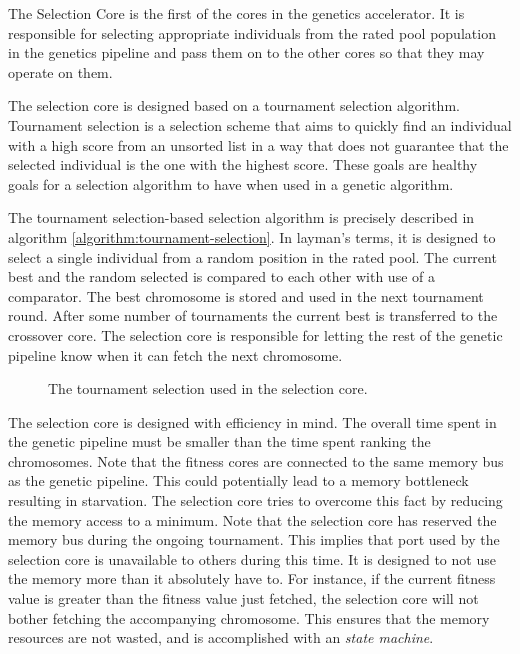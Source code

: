 The Selection Core is the first of the cores in the genetics accelerator.
It is responsible for selecting appropriate individuals from the rated pool population in the genetics pipeline and pass them on to the other cores so that they may operate on them.

The selection core is designed based on a tournament selection algorithm.
Tournament selection is a selection scheme that aims to quickly find an individual with a high score from an unsorted list in a way that does not guarantee that the selected individual is the one with the highest score.
These goals are healthy goals for a selection algorithm to have when used in a genetic algorithm.

The tournament selection-based selection algorithm is precisely described in algorithm \vref{algorithm:tournament-selection}.
In layman's terms, it is designed to select a single individual from a random position in the rated pool.
The current best and the random selected is compared to each other with use of a comparator.
The best chromosome is stored and used in the next tournament round.
After some number of tournaments the current best is transferred to the crossover core.
The selection core is responsible for letting the rest of the genetic pipeline know when it can fetch the next chromosome. 

\begin{figure}[H]
\begin{algorithm}[H]
\SetAlgoLined
\DontPrintSemicolon
{}
\caption{The tournament selection used in the selection core.}
\label{algorithm:tournament-selection}
\end{algorithm}
\end{figure}

The selection core is designed with efficiency in mind.
The overall time spent in the genetic pipeline must be smaller than the time spent ranking the chromosomes.
Note that the fitness cores are connected to the same memory bus as the genetic pipeline.
This could potentially lead to a memory bottleneck resulting in starvation.
The selection core tries to overcome this fact by reducing the memory access to a minimum.
Note that the selection core has reserved the memory bus during the ongoing tournament.
This implies that port used by the selection core is unavailable to others during this time.
It is designed to not use the memory more than it absolutely have to.
For instance, if the current fitness value is greater than the fitness value just fetched, the selection core will not bother fetching the accompanying chromosome.
This ensures that the memory resources are not wasted, and is accomplished with an \emph{state machine}. 

